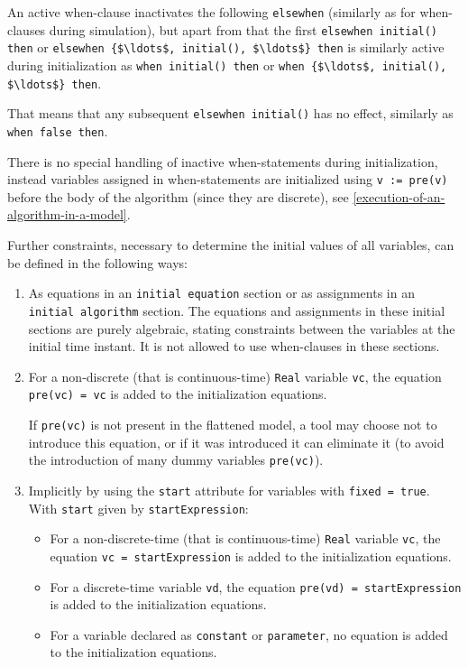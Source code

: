 An active when-clause inactivates the following \lstinline!elsewhen! (similarly as for when-clauses during simulation), but apart from that
the first \lstinline!elsewhen initial() then! or \lstinline!elsewhen {$\ldots$, initial(), $\ldots$} then! is similarly active during initialization as
\lstinline!when initial() then! or \lstinline!when {$\ldots$, initial(), $\ldots$} then!.

\begin{nonnormative}
That means that any subsequent \lstinline!elsewhen initial()! has no effect,
similarly as \lstinline!when false then!.
\end{nonnormative}

\begin{nonnormative}
There is no special handling of inactive when-statements during initialization, instead
variables assigned in when-statements are initialized using \lstinline!v := pre(v)!
before the body of the algorithm (since they are discrete), see \cref{execution-of-an-algorithm-in-a-model}.
\end{nonnormative}

Further constraints, necessary to determine the initial values of all
variables, can be defined in the following ways:
\begin{enumerate}
\item
  As equations in an \lstinline!initial equation! section or as assignments in an \lstinline!initial algorithm! section.
  The equations and assignments in these initial sections are purely algebraic, stating constraints between the variables at the initial time instant.
  It is not allowed to use when-clauses in these sections.
\item
  For a non-discrete (that is continuous-time) \lstinline!Real! variable \lstinline!vc!, the equation \lstinline!pre(vc) = vc! is added to the initialization equations.
  \begin{nonnormative}
  If \lstinline!pre(vc)! is not present in the flattened model, a tool may choose not to introduce this equation, or if it was introduced
  it can eliminate it (to avoid the introduction of many dummy variables \lstinline!pre(vc)!).
  \end{nonnormative}
\item
  Implicitly by using the \lstinline!start! attribute for variables with \lstinline!fixed = true!.  With \lstinline!start! given by \lstinline!startExpression!:
  \begin{itemize}
  \item
    For a non-discrete-time (that is continuous-time) \lstinline!Real! variable \lstinline!vc!, the equation \lstinline!vc = startExpression! is added to the initialization equations.
  \item
    For a discrete-time variable \lstinline!vd!, the equation \lstinline!pre(vd) = startExpression! is added to the initialization equations.
  \item
    For a variable declared as \lstinline!constant! or \lstinline!parameter!, no equation is added to the initialization equations.
  \end{itemize}
\end{enumerate}

